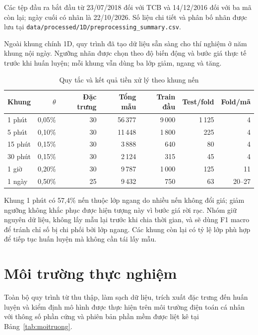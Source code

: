 \documentclass[12pt,a4paper,oneside]{report}
\begin{document}
Các tệp đầu ra bắt đầu từ 23/07/2018 đối với TCB và 14/12/2016 đối với ba mã
còn lại; ngày cuối có nhãn là 22/10/2026. Số liệu chi tiết và phân bố nhãn được
lưu tại \texttt{data/processed/1D/preprocessing\_summary.csv}.

Ngoài khung chính 1D, quy trình đã tạo dữ liệu sẵn sàng cho thí nghiệm ở năm
khung nội ngày. Ngưỡng nhãn được chọn theo độ biến động và bước giá thực tế
trước khi huấn luyện; mỗi khung vẫn dùng ba lớp giảm, ngang và tăng.

\begin{table}[H]
  \centering
  \caption{Quy tắc và kết quả tiền xử lý theo khung nến}
  \label{tab:processedkhung}
  \begin{tabular}{lrrrrrr}
    \toprule
    \textbf{Khung} & \textbf{$\theta$} & \textbf{Đặc trưng} & \textbf{Tổng mẫu} & \textbf{Train đầu} & \textbf{Test/fold} & \textbf{Fold/mã} \\
    \midrule
    1 phút  & 0,05\% & 30 & 56\,377 & 9\,000 & 1\,125 & 4 \\
    5 phút  & 0,10\% & 30 & 11\,448 & 1\,800 & 225 & 4 \\
    15 phút & 0,15\% & 30 & 3\,888  & 640 & 80 & 4 \\
    30 phút & 0,15\% & 30 & 2\,124  & 315 & 45 & 4 \\
    1 giờ   & 0,20\% & 30 & 9\,787  & 1\,000 & 125 & 11 \\
    1 ngày  & 0,50\% & 25 & 9\,432  & 750 & 63 & 20--27 \\
    \bottomrule
  \end{tabular}
\end{table}

Khung 1 phút có 57,4\% nến thuộc lớp ngang do nhiều nến không đổi giá; giảm
ngưỡng không khắc phục được hiện tượng này vì bước giá rời rạc. Nhóm giữ nguyên
dữ liệu, không lấy mẫu lại trước khi chia thời gian, và sẽ dùng F1 macro để
tránh chỉ số bị chi phối bởi lớp ngang. Các khung còn lại có tỷ lệ lớp phù hợp
để tiếp tục huấn luyện mà không cần tái lấy mẫu.

\section{Môi trường thực nghiệm}
Toàn bộ quy trình từ thu thập, làm sạch dữ liệu, trích xuất đặc trưng đến huấn luyện
và kiểm định mô hình được thực hiện trên môi trường điện toán cá nhân với thông số
phần cứng và phiên bản phần mềm được liệt kê tại Bảng~\ref{tab:moitruong}.
\end{document}
